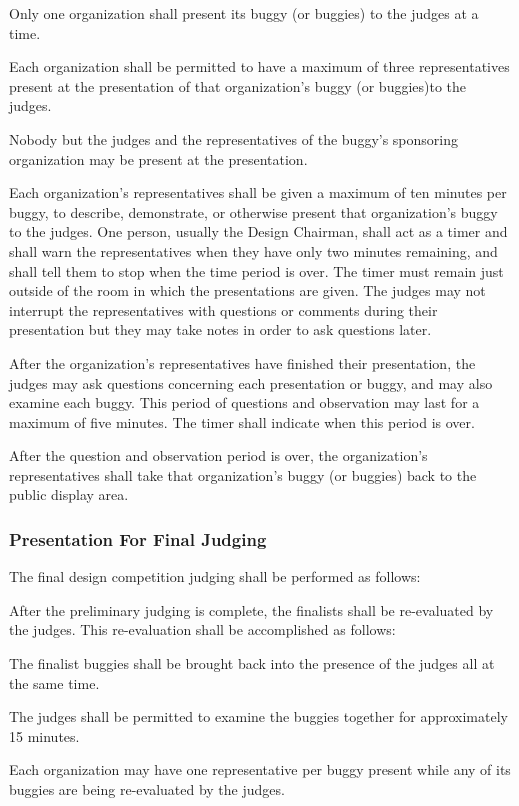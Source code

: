 Only one organization shall present its buggy (or buggies) to the judges at a time.

Each organization shall be permitted to have a maximum of three representatives present at the presentation of that organization's buggy (or buggies)to the judges.

Nobody but the judges and the representatives of the buggy's sponsoring organization may be present at the presentation.

Each organization's representatives shall be given a maximum of ten minutes per buggy, to describe, demonstrate, or otherwise present that organization's buggy to the judges. One person, usually the Design Chairman, shall act as a timer and shall warn the representatives when they have only two minutes remaining, and shall tell them to stop when the time period is over. The timer must remain just outside of the room in which the presentations are given. The judges may not interrupt the representatives with questions or comments during their presentation but they may take notes in order to ask questions later.

After the organization's representatives have finished their presentation, the judges may ask questions concerning each presentation or buggy, and may also examine each buggy. This period of questions and observation may last for a maximum of five minutes. The timer shall indicate when this period is over.

After the question and observation period is over, the organization's representatives shall take that organization's buggy (or buggies) back to the public display area.

\subsubsection{Presentation For Final Judging}

The final design competition judging shall be performed as follows:

After the preliminary judging is complete, the finalists shall be re-evaluated by the judges. This re-evaluation shall be accomplished as follows:

The finalist buggies shall be brought back into the presence of the judges all at the same time.

The judges shall be permitted to examine the buggies together for approximately 15 minutes.

Each organization may have one representative per buggy present while any of its buggies are being re-evaluated by the judges.

